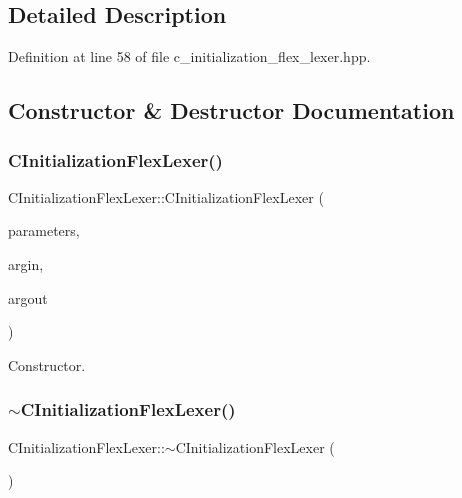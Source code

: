 \subsection{Detailed Description}


Definition at line 58 of file c\+\_\+initialization\+\_\+flex\+\_\+lexer.\+hpp.



\subsection{Constructor \& Destructor Documentation}
\mbox{\label{classCInitializationFlexLexer_a8a6f7adea340f945b7e352c3e2e0234b}} 
\subsubsection{\texorpdfstring{C\+Initialization\+Flex\+Lexer()}{CInitializationFlexLexer()}}
{\footnotesize\ttfamily C\+Initialization\+Flex\+Lexer\+::\+C\+Initialization\+Flex\+Lexer (\begin{DoxyParamCaption}\item[{const \hyperlink{Parameter_8hpp_a37841774a6fcb479b597fdf8955eb4ea}{Parameter\+Const\+Ref}}]{parameters,  }\item[{std\+::istream $\ast$}]{argin,  }\item[{std\+::ostream $\ast$}]{argout }\end{DoxyParamCaption})}



Constructor. 

\mbox{\label{classCInitializationFlexLexer_a49633db98ec6322a9727c242e6b37629}} 
\subsubsection{\texorpdfstring{$\sim$\+C\+Initialization\+Flex\+Lexer()}{~CInitializationFlexLexer()}}
{\footnotesize\ttfamily C\+Initialization\+Flex\+Lexer\+::$\sim$\+C\+Initialization\+Flex\+Lexer (\begin{DoxyParamCaption}{ }\end{DoxyParamCaption})}



